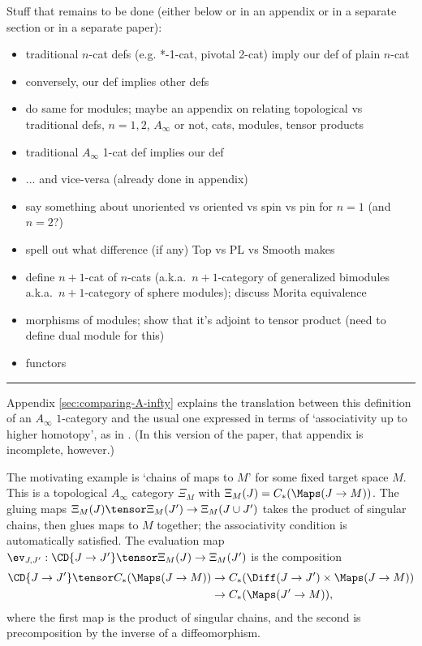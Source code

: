 Stuff that remains to be done (either below or in an appendix or in a separate section or in
a separate paper):
\begin{itemize}
\item traditional $n$-cat defs (e.g. *-1-cat, pivotal 2-cat) imply our def of plain $n$-cat
\item conversely, our def implies other defs
\item do same for modules; maybe an appendix on relating topological
vs traditional defs, $n = 1,2$, $A_\infty$ or not, cats, modules, tensor products
\item traditional $A_\infty$ 1-cat def implies our def
\item ... and vice-versa (already done in appendix)
\item say something about unoriented vs oriented vs spin vs pin for $n=1$ (and $n=2$?)
\item spell out what difference (if any) Top vs PL vs Smooth makes
\item define $n{+}1$-cat of $n$-cats (a.k.a.\ $n{+}1$-category of generalized bimodules
a.k.a.\ $n{+}1$-category of sphere modules); discuss Morita equivalence
\item morphisms of modules; show that it's adjoint to tensor product
(need to define dual module for this)
\item functors
\end{itemize}

\hrule

Appendix \ref{sec:comparing-A-infty} explains the translation between this definition of an $A_\infty$ $1$-category and the usual one expressed in terms of `associativity up to higher homotopy', as in \cite{MR1854636}. (In this version of the paper, that appendix is incomplete, however.)

The motivating example is `chains of maps to $M$' for some fixed target space $M$. This is a topological $A_\infty$ category $\Xi_M$ with $\Xi_M(J) = C_*(\Maps(J \to M))$. The gluing maps $\Xi_M(J) \tensor \Xi_M(J') \to \Xi_M(J \cup J')$  takes the product of singular chains, then glues maps to $M$ together; the associativity condition is automatically satisfied. The evaluation map $\ev_{J,J'} : \CD{J \to J'} \tensor \Xi_M(J) \to \Xi_M(J')$ is the composition
\begin{align*}
\CD{J \to J'} \tensor C_*(\Maps(J \to M)) & \to C_*(\Diff(J \to J') \times \Maps(J \to M)) \\ & \to C_*(\Maps(J' \to M)),
\end{align*}
where the first map is the product of singular chains, and the second is precomposition by the inverse of a diffeomorphism.

